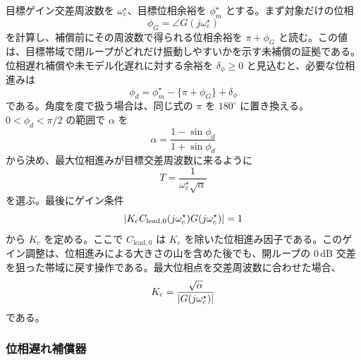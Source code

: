 目標ゲイン交差周波数を $\omega_c^\star$、目標位相余裕を $\phi_m^\star$ とする。まず対象だけの位相
\begin{equation}
  \phi_G=\angle G(j\omega_c^\star)
\end{equation}
を計算し、補償前にその周波数で得られる位相余裕を $\pi+\phi_G$ と読む。この値は、目標帯域で閉ループがどれだけ振動しやすいかを示す未補償の証拠である。位相遅れ補償や未モデル化遅れに対する余裕を $\delta_\phi\ge0$ と見込むと、必要な位相進みは
\begin{equation}
  \phi_d
  =\phi_m^\star-\{\pi+\phi_G\}+\delta_\phi
\end{equation}
である。角度を度で扱う場合は、同じ式の $\pi$ を $180^\circ$ に置き換える。$0<\phi_d<\pi/2$ の範囲で $\alpha$ を
\begin{equation}
  \alpha=\frac{1-\sin\phi_d}{1+\sin\phi_d}
\end{equation}
から決め、最大位相進みが目標交差周波数に来るように
\begin{equation}
  T=\frac{1}{\omega_c^\star\sqrt{\alpha}}
\end{equation}
を選ぶ。最後にゲイン条件
\begin{equation}
  \left|K_c C_{\mathrm{lead},0}(j\omega_c^\star)G(j\omega_c^\star)\right|=1
\end{equation}
から $K_c$ を定める。ここで $C_{\mathrm{lead},0}$ は $K_c$ を除いた位相進み因子である。このゲイン調整は、位相進みによる大きさの山を含めた後でも、開ループの $0\,\mathrm{dB}$ 交差を狙った帯域に戻す操作である。最大位相点を交差周波数に合わせた場合、
\begin{equation}
  K_c
  =\frac{\sqrt{\alpha}}{\left|G(j\omega_c^\star)\right|}
\end{equation}
である。

\subsubsection{位相遅れ補償器}

